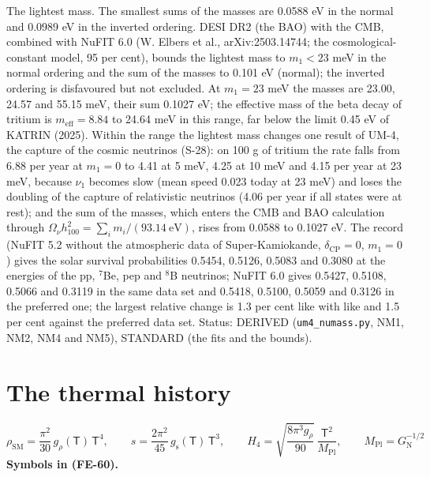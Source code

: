 \documentclass[
  10pt,
]{article}
\begin{document}
The lightest mass. The smallest sums of the masses are 0.0588 eV in the
normal and 0.0989 eV in the inverted ordering. DESI DR2 (the BAO) with
the CMB, combined with NuFIT 6.0 (W. Elbers et al., arXiv:2503.14744;
the cosmological-constant model, 95 per cent), bounds the lightest mass
to \(m_1 < 23\) meV in the normal ordering and the sum of the masses to
0.101 eV (normal); the inverted ordering is disfavoured but not
excluded. At \(m_1 = 23\) meV the masses are 23.00, 24.57 and 55.15 meV,
their sum 0.1027 eV; the effective mass of the beta decay of tritium is
\(m_{\mathrm{eff}} = 8.84\) to 24.64 meV in this range, far below the
limit 0.45 eV of KATRIN (2025). Within the range the lightest mass
changes one result of UM-4, the capture of the cosmic neutrinos (S-28):
on 100 g of tritium the rate falls from 6.88 per year at \(m_1 = 0\) to
4.41 at 5 meV, 4.25 at 10 meV and 4.15 per year at 23 meV, because
\(\nu_1\) becomes slow (mean speed 0.023 today at 23 meV) and loses the
doubling of the capture of relativistic neutrinos (4.06 per year if all
states were at rest); and the sum of the masses, which enters the CMB
and BAO calculation through
\(\Omega_\nu h_{100}^2 = \sum_i m_i/(93.14\ \text{eV})\), rises from
0.0588 to 0.1027 eV. The record (NuFIT 5.2 without the atmospheric data
of Super-Kamiokande, \(\delta_{\mathrm{CP}} = 0\), \(m_1 = 0\)) gives
the solar survival probabilities 0.5454, 0.5126, 0.5083 and 0.3080 at
the energies of the pp, \(^7\)Be, pep and \(^8\)B neutrinos; NuFIT 6.0
gives 0.5427, 0.5108, 0.5066 and 0.3119 in the same data set and 0.5418,
0.5100, 0.5059 and 0.3126 in the preferred one; the largest relative
change is 1.3 per cent like with like and 1.5 per cent against the
preferred data set. Status: DERIVED (\texttt{um4\_numass.py}, NM1, NM2,
NM4 and NM5), STANDARD (the fits and the bounds).

\hypertarget{the-thermal-history}{%
\section{The thermal history}\label{the-thermal-history}}

\[
\rho_{\mathrm{SM}} = \frac{\pi^2}{30}\,g_\rho(\mathsf{T})\,\mathsf{T}^4,\qquad s = \frac{2\pi^2}{45}\,g_{\mathrm{s}}(\mathsf{T})\,\mathsf{T}^3,\qquad
H_4 = \sqrt{\frac{8\pi^3g_\rho}{90}}\,\frac{\mathsf{T}^2}{M_{\mathrm{Pl}}},\qquad M_{\mathrm{Pl}} = G_{\mathrm{N}}^{-1/2} \tag{FE-60}
\] \textbf{Symbols in (FE-60).}
\end{document}
